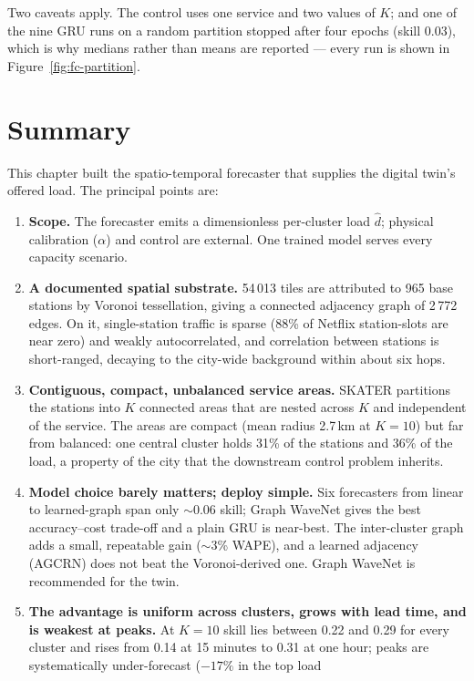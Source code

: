 Two caveats apply. The control uses one service and two values of $K$; and one of the nine GRU runs
on a random partition stopped after four epochs (skill 0.03), which is why medians rather than
means are reported --- every run is shown in Figure~\ref{fig:fc-partition}.

\section{Summary}
\label{sec:fc-summary}

This chapter built the spatio-temporal forecaster that supplies the digital twin's offered load.
The principal points are:

\begin{enumerate}
  \item \textbf{Scope.} The forecaster emits a dimensionless per-cluster load $\hat d$; physical
  calibration ($\alpha$) and control are external. One trained model serves every capacity scenario.
  \item \textbf{A documented spatial substrate.} 54\,013 tiles are attributed to 965 base stations by
  Voronoi tessellation, giving a connected adjacency graph of 2\,772 edges. On it, single-station
  traffic is sparse (88\% of Netflix station-slots are near zero) and weakly autocorrelated, and
  correlation between stations is short-ranged, decaying to the city-wide background within about six
  hops.
  \item \textbf{Contiguous, compact, unbalanced service areas.} SKATER partitions the stations into
  $K$ connected areas that are nested across $K$ and independent of the service. The areas are
  compact (mean radius 2.7\,km at $K{=}10$) but far from balanced: one central cluster holds 31\% of
  the stations and 36\% of the load, a property of the city that the downstream control problem
  inherits.
  \item \textbf{Model choice barely matters; deploy simple.} Six forecasters from linear to learned-graph
  span only $\sim$0.06 skill; Graph WaveNet gives the best accuracy--cost trade-off and a plain GRU is
  near-best. The inter-cluster graph adds a small, repeatable gain ($\sim$3\% WAPE), and a learned
  adjacency (AGCRN) does not beat the Voronoi-derived one. Graph WaveNet is recommended for the twin.
  \item \textbf{The advantage is uniform across clusters, grows with lead time, and is weakest at
  peaks.} At $K{=}10$ skill lies between 0.22 and 0.29 for every cluster and rises from 0.14 at 15
  minutes to 0.31 at one hour; peaks are systematically under-forecast ($-17\%$ in the top load

\end{enumerate}
